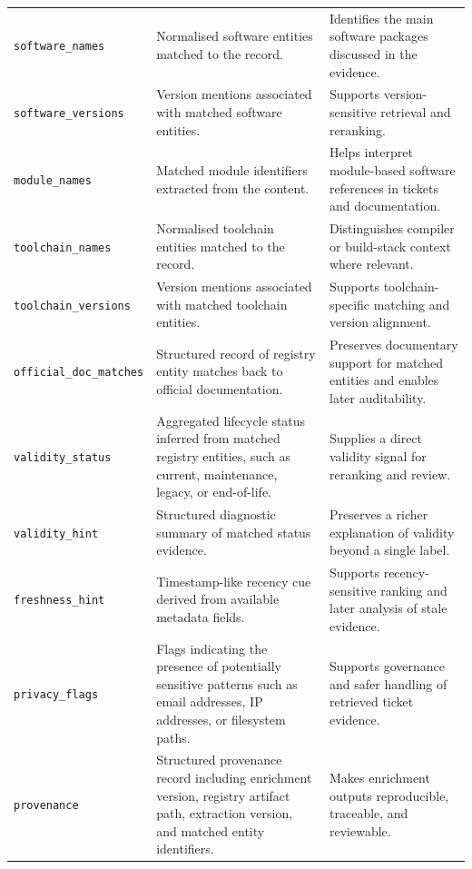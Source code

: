 \begin{longtable}{@{}p{} p{} p{}@{}}
\texttt{software\_names} & Normalised software entities matched to the record. & Identifies the main software packages discussed in the evidence. \\

\texttt{software\_versions} & Version mentions associated with matched software entities. & Supports version-sensitive retrieval and reranking. \\

\texttt{module\_names} & Matched module identifiers extracted from the content. & Helps interpret module-based software references in tickets and documentation. \\

\texttt{toolchain\_names} & Normalised toolchain entities matched to the record. & Distinguishes compiler or build-stack context where relevant. \\

\texttt{toolchain\_versions} & Version mentions associated with matched toolchain entities. & Supports toolchain-specific matching and version alignment. \\

\texttt{official\_doc\_matches} & Structured record of registry entity matches back to official documentation. & Preserves documentary support for matched entities and enables later auditability. \\

\texttt{validity\_status} & Aggregated lifecycle status inferred from matched registry entities, such as current, maintenance, legacy, or end-of-life. & Supplies a direct validity signal for reranking and review. \\

\texttt{validity\_hint} & Structured diagnostic summary of matched status evidence. & Preserves a richer explanation of validity beyond a single label. \\

\texttt{freshness\_hint} & Timestamp-like recency cue derived from available metadata fields. & Supports recency-sensitive ranking and later analysis of stale evidence. \\

\texttt{privacy\_flags} & Flags indicating the presence of potentially sensitive patterns such as email addresses, IP addresses, or filesystem paths. & Supports governance and safer handling of retrieved ticket evidence. \\

\texttt{provenance} & Structured provenance record including enrichment version, registry artifact path, extraction version, and matched entity identifiers. & Makes enrichment outputs reproducible, traceable, and reviewable. \\

\end{longtable}
